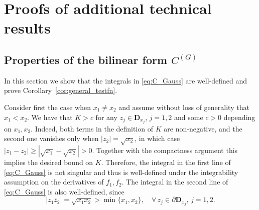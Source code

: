 \documentclass[10pt]{amsart}
\numberwithin{equation}{section}
\newcommand{\DD}{\mathbf{D}}
\begin{document}
\appendix

\section{Proofs of additional technical results}

\subsection{Properties of the bilinear form $C^{(G)}$}\label{sec:C_properties} 

In this section we show that the integrals in \eqref{eq:C_Gauss} are well-defined and prove Corollary~\ref{cor:general_testfn}.

Consider first the case when $x_1\neq x_2$ and assume without loss of generality that $x_1<x_2$. We have that $K>c$ for any $z_j\in\DD_{x_j}$, $j=1,2$ and some $c>0$ depending on $x_1,x_2$. Indeed, both terms in the definition of $K$ are non-negative, and the second one vanishes only when $|z_2|=\sqrt{x_2}$, in which case $|z_1-z_2|\ge |\sqrt{x_1}-\sqrt{x_2}|>0$. Together with the compactness argument this implies the desired bound on $K$. Therefore, the integral in the first line of \eqref{eq:C_Gauss} is not singular and thus is well-defined under the integrability assumption on the derivatives of $f_1,f_2$. The integral in the second line of \eqref{eq:C_Gauss} is also well-defined, since
\begin{equation}
|z_1\overline{z}_2|=\sqrt{x_1x_2}>\min\{x_1,x_2\},\quad \forall \, z_j\in \partial\DD_{x_j},\, j=1,2.
\end{equation}
\end{document}
